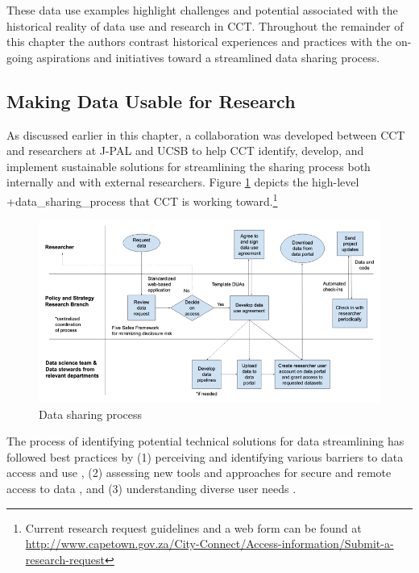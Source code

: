 \documentclass[
]{WileySix}
\begin{document}
These data use examples highlight challenges and potential associated with the historical reality of data use and research in CCT. Throughout the remainder of this chapter the authors contrast historical experiences and practices with the on-going aspirations and initiatives toward a streamlined data sharing process.

\hypertarget{making-data-usable-for-research-5}{%
\subsection{Making Data Usable for Research}\label{making-data-usable-for-research-5}}

As discussed earlier in this chapter, a collaboration was developed between CCT and researchers at J-PAL and UCSB to help CCT identify, develop, and implement sustainable solutions for streamlining the sharing process both internally and with external researchers. Figure \ref{fig:cctfigure1} depicts the high-level +data\_sharing\_process\textbar{} that CCT is working toward.\footnote{Current research request guidelines and a web form can be found at \url{http://www.capetown.gov.za/City-Connect/Access-information/Submit-a-research-request}}

\begin{figure}
\includegraphics[width=1\linewidth]{./assets/cct/cctfigure1web} \caption{Data sharing process}\label{fig:cctfigure1}
\end{figure}

The process of identifying potential technical solutions for data streamlining has followed best practices by (1) perceiving and identifying various barriers to data access and use \citep{connelly2016, goerge2018, lane2008, petrila2018, abraham2019}, (2) assessing new tools and approaches for secure and remote access to data \citep{lane2008, culhane2018, foster2018}, and (3) understanding diverse user needs \citep{lane2018, abraham2019}.
\end{document}
